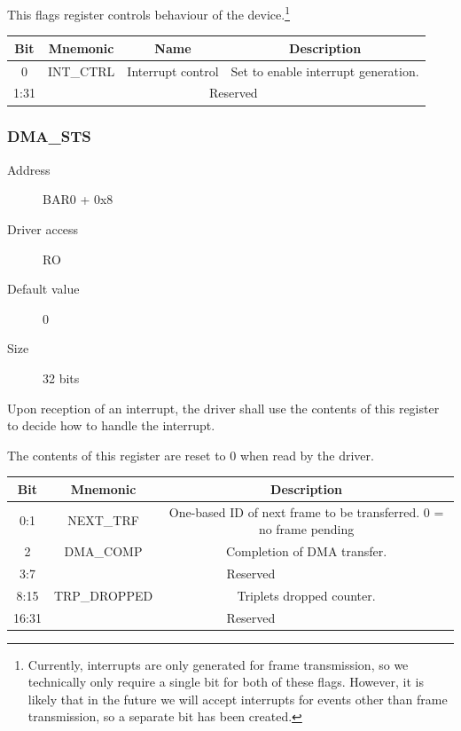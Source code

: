 \documentclass[12pt]{article}
\begin{document}
This flags register controls behaviour of the device.\footnote{Currently, interrupts are only generated for frame transmission, so we technically only require a single bit for both of these flags. However, it is likely that in the future we will accept interrupts for events other than frame transmission, so a separate bit has been created.}

\begin{tabular}{|c|c|c|c|}\hline
\textbf{Bit} & \textbf{Mnemonic} & \textbf{Name} & \textbf{Description} \\ \hline
0 & INT\_CTRL & Interrupt control & Set to enable interrupt generation. \\ \hline
1:31 & \multicolumn{3}{|c|}{Reserved} \\ \hline
\end{tabular}

\subsubsection{DMA\_STS}

\begin{description}
\item[Address] BAR0 + 0x8
\item[Driver access] RO
\item[Default value] 0
\item[Size] 32 bits
\end{description}

Upon reception of an interrupt, the driver shall use the contents of this register to decide how to handle the interrupt.

The contents of this register are reset to 0 when read by the driver.

\begin{tabular}{|c|c|c|} \hline
\textbf{Bit} & \textbf{Mnemonic} & \textbf{Description} \\ \hline
0:1 & NEXT\_TRF & One-based ID of next frame to be transferred. 0 = no frame pending \\ \hline
2 & DMA\_COMP & Completion of DMA transfer. \\ \hline
3:7 & \multicolumn{2}{|c|}{Reserved} \\ \hline
8:15 & TRP\_DROPPED & Triplets dropped counter. \\ \hline
16:31 & \multicolumn{2}{|c|}{Reserved} \\ \hline
\end{tabular}
\end{document}
